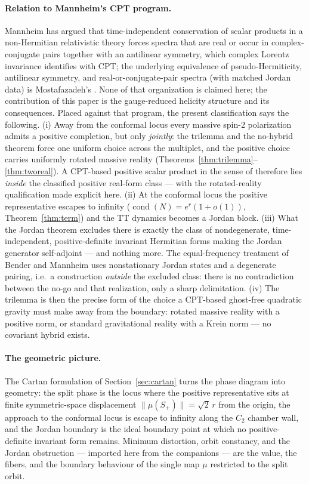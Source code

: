 \documentclass[11pt]{article}
\theoremstyle{definition}
\theoremstyle{remark}
\begin{document}
\paragraph{Relation to Mannheim's CPT program.}
Mannheim has argued \cite{Mannheim2016} that time-independent
conservation of scalar products in a non-Hermitian relativistic theory
forces spectra that are real or occur in complex-conjugate pairs
together with an antilinear symmetry, which complex Lorentz invariance
identifies with CPT; the underlying equivalence of pseudo-Hermiticity,
antilinear symmetry, and real-or-conjugate-pair spectra (with matched
Jordan data) is Mostafazadeh's \cite{Mostafazadeh2002nd}.  None of that
organization is claimed here; the contribution of this paper is the
gauge-reduced helicity structure and its consequences.  Placed against
that program, the present classification says the following.  (i) Away
from the conformal locus every massive spin-$2$ polarization admits a
positive completion, but only \emph{jointly}: the trilemma and the
no-hybrid theorem force one uniform choice across the multiplet, and the
positive choice carries uniformly rotated massive reality
(Theorems~\ref{thm:trilemma}--\ref{thm:tworeal}).  A CPT-based positive
scalar product in the sense of \cite{Mannheim2016} therefore lies
\emph{inside} the classified positive real-form class --- with the
rotated-reality qualification made explicit here.  (ii) At the conformal
locus the positive representative escapes to infinity
($\operatorname{cond}(N)=e^{r}(1+o(1))$, Theorem~\ref{thm:term}) and the
TT dynamics becomes a Jordan block.  (iii) What the Jordan theorem
excludes there is exactly the class of nondegenerate, time-independent,
positive-definite invariant Hermitian forms making the Jordan generator
self-adjoint --- and nothing more.  The equal-frequency treatment of
Bender and Mannheim \cite{BM2008Jordan} uses nonstationary Jordan states
and a degenerate pairing, i.e.\ a construction \emph{outside} the
excluded class: there is no contradiction between the no-go and that
realization, only a sharp delimitation.  (iv) The trilemma is then the
precise form of the choice a CPT-based ghost-free quadratic gravity must
make away from the boundary: rotated massive reality with a positive
norm, or standard gravitational reality with a Krein norm --- no
covariant hybrid exists.

\paragraph{The geometric picture.}
The Cartan formulation of Section~\ref{sec:cartan} turns the phase
diagram into geometry: the split phase is the locus where the positive
representative sits at finite symmetric-space displacement
$\|\mu(S_+)\|=\sqrt2\,r$ from the origin, the approach to the conformal
locus is escape to infinity along the $C_2$ chamber wall, and the Jordan
boundary is the ideal boundary point at which no positive-definite
invariant form remains.  Minimum distortion, orbit constancy, and the
Jordan obstruction --- imported here from the companions --- are the
value, the fibers, and the boundary behaviour of the single map $\mu$
restricted to the split orbit.
\end{document}
